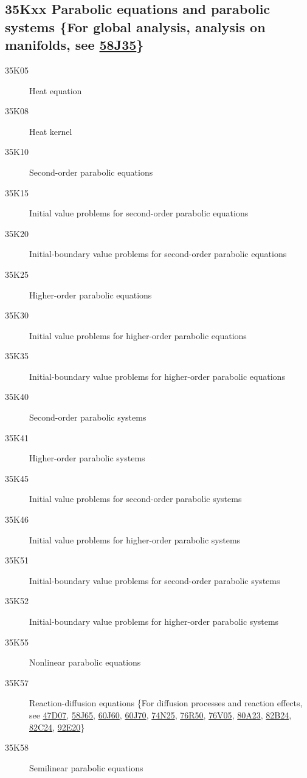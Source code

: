 \subsection*{35Kxx  Parabolic equations and parabolic  systems  \{For global analysis, analysis on manifolds, see \hyperref[58J35]{58J35}\} }\label{35Kxx}
\begin{description}
\item [35K05]\label{35K05} Heat equation
\item [35K08]\label{35K08} Heat kernel
\item [35K10]\label{35K10} Second-order parabolic  equations
\item [35K15]\label{35K15} Initial value problems for second-order parabolic equations
\item [35K20]\label{35K20} Initial-boundary value problems for second-order parabolic equations 
\item [35K25]\label{35K25} Higher-order parabolic  equations
\item [35K30]\label{35K30} Initial value problems for higher-order parabolic  equations
\item [35K35]\label{35K35} Initial-boundary value problems for higher-order parabolic  equations
\item [35K40]\label{35K40} Second-order parabolic systems  
\item [35K41]\label{35K41} Higher-order parabolic systems 
\item [35K45]\label{35K45} Initial value problems for second-order parabolic systems 
\item [35K46]\label{35K46} Initial value problems for higher-order parabolic systems 
\item [35K51]\label{35K51} Initial-boundary value problems for second-order parabolic systems 
\item [35K52]\label{35K52} Initial-boundary value problems for higher-order  parabolic systems 
\item [35K55]\label{35K55} Nonlinear parabolic equations
\item [35K57]\label{35K57} Reaction-diffusion equations \{For diffusion processes and reaction effects, see \hyperref[47D07]{47D07}, \hyperref[58J65]{58J65}, \hyperref[60J60]{60J60}, \hyperref[60J70]{60J70}, \hyperref[74N25]{74N25}, \hyperref[76R50]{76R50}, \hyperref[76V05]{76V05}, \hyperref[80A23]{80A23},  \hyperref[82B24]{82B24}, \hyperref[82C24]{82C24}, \hyperref[92E20]{92E20}\}
\item [35K58]\label{35K58} Semilinear parabolic equations

\end{description}
